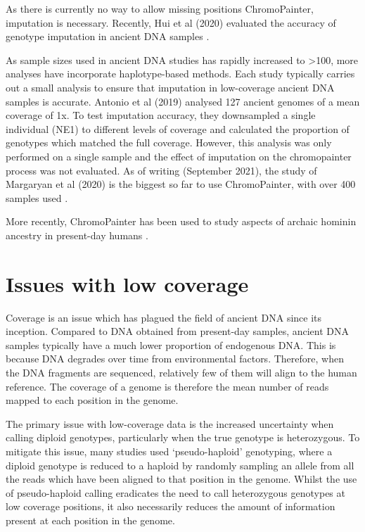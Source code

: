 {As there is currently no way to allow missing positions ChromoPainter, imputation is necessary. Recently, Hui et al (2020) evaluated the accuracy of genotype imputation in ancient DNA samples \cite{hui2020evaluating}. 

As sample sizes used in ancient DNA studies has rapidly increased to >100, more analyses have incorporate haplotype-based methods. Each study typically carries out a small analysis to ensure that imputation in low-coverage ancient DNA samples is accurate. Antonio et al (2019) \cite{antonio2019ancient} analysed 127 ancient genomes of a mean coverage of 1x. To test imputation accuracy, they downsampled a single individual (NE1) to different levels of coverage and calculated the proportion of genotypes which matched the full coverage. However, this analysis was only performed on a single sample and the effect of imputation on the chromopainter process was not evaluated. As of writing (September 2021), the study of Margaryan et al (2020) is the biggest so far to use ChromoPainter, with over 400 samples used \cite{margaryan2020population}.

More recently, ChromoPainter has been used to study aspects of archaic hominin ancestry in present-day humans \cite{JACOBS20191010, teixeira2021widespread}.

\section{Issues with low coverage}

Coverage is an issue which has plagued the field of ancient DNA since its inception. Compared to DNA obtained from present-day samples, ancient DNA samples typically have a much lower proportion of endogenous DNA. This is because DNA degrades over time from environmental factors. Therefore, when the DNA fragments are sequenced, relatively few of them will align to the human reference. The coverage of a genome is therefore the mean number of reads mapped to each position in the genome. 

The primary issue with low-coverage data is the increased uncertainty when calling diploid genotypes, particularly when the true genotype is heterozygous. To mitigate this issue, many studies used `pseudo-haploid' genotyping, where a diploid genotype is reduced to a haploid by randomly sampling an allele from all the reads which have been aligned to that position in the genome. Whilst the use of pseudo-haploid calling eradicates the need to call heterozygous genotypes at low coverage positions, it also necessarily reduces the amount of information present at each position in the genome.

}

